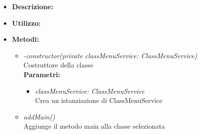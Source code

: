 \begin{itemize}
	\item \textbf{Descrizione:}\\
	
	\item \textbf{Utilizzo:}\\
	
	\item \textbf{Metodi:}
		\begin{itemize}
			\item \emph{-constructor(private classMenuService: ClassMenuService)}\\
    		Costruttore della classe\\
    		\textbf{Parametri:}
    		\begin{itemize}
    			\item \emph{classMenuService: ClassMenuService}\\
    			Crea un istanziazione di ClassMenuService
    		\end{itemize}
    		\item \emph{addMain()}\\
    		Aggiunge il metodo main alla classe selezionata
		\end{itemize}
\end{itemize}